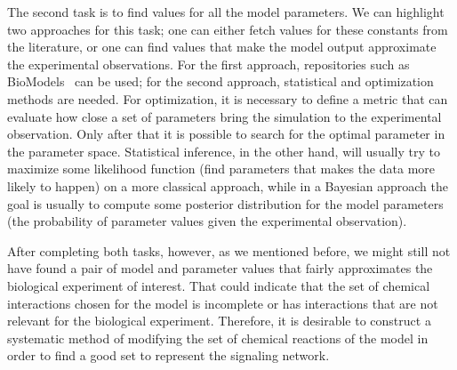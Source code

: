 The second task is to find values for all the model parameters. We can
highlight two approaches for this task; one can either fetch values for 
these constants from the literature, or one can find values that make 
the model output approximate the experimental observations. For the
first approach, repositories such as BioModels~\cite{le2006biomodels} 
can be used; for the second approach, statistical and optimization
methods are needed. For optimization, it is necessary to define a metric
that can evaluate how close a set of parameters bring the simulation to 
the experimental observation. Only after that it is possible to search 
for the optimal parameter in the parameter space. Statistical inference, 
in the other hand, will usually try to maximize some likelihood function 
(find parameters that makes the data more likely to happen) on a more 
classical approach, while in a Bayesian approach the goal is usually to
compute some posterior distribution for the model parameters (the 
probability of parameter values given the experimental observation).


After completing both tasks, however, as we mentioned before, we might 
still not have found a pair of model and parameter values that fairly 
approximates the biological experiment of interest. That could indicate 
that the set of chemical interactions chosen for the model is 
incomplete or has interactions that are not relevant for the biological 
experiment. Therefore, it is desirable to construct a systematic method 
of modifying the set of chemical reactions of the model in order to 
find a good set to represent the signaling network.

